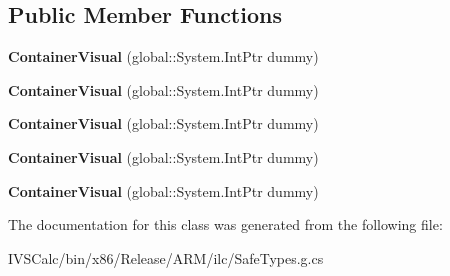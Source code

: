 \subsection*{Public Member Functions}
\begin{DoxyCompactItemize}
\item 
\mbox{\label{class_windows_1_1_u_i_1_1_composition_1_1_container_visual_a8a0464c00372f6754bae6f0e8e995626}} 
{\bfseries Container\+Visual} (global\+::\+System.\+Int\+Ptr dummy)
\item 
\mbox{\label{class_windows_1_1_u_i_1_1_composition_1_1_container_visual_a8a0464c00372f6754bae6f0e8e995626}} 
{\bfseries Container\+Visual} (global\+::\+System.\+Int\+Ptr dummy)
\item 
\mbox{\label{class_windows_1_1_u_i_1_1_composition_1_1_container_visual_a8a0464c00372f6754bae6f0e8e995626}} 
{\bfseries Container\+Visual} (global\+::\+System.\+Int\+Ptr dummy)
\item 
\mbox{\label{class_windows_1_1_u_i_1_1_composition_1_1_container_visual_a8a0464c00372f6754bae6f0e8e995626}} 
{\bfseries Container\+Visual} (global\+::\+System.\+Int\+Ptr dummy)
\item 
\mbox{\label{class_windows_1_1_u_i_1_1_composition_1_1_container_visual_a8a0464c00372f6754bae6f0e8e995626}} 
{\bfseries Container\+Visual} (global\+::\+System.\+Int\+Ptr dummy)
\end{DoxyCompactItemize}


The documentation for this class was generated from the following file\+:\begin{DoxyCompactItemize}
\item 
I\+V\+S\+Calc/bin/x86/\+Release/\+A\+R\+M/ilc/Safe\+Types.\+g.\+cs\end{DoxyCompactItemize}
